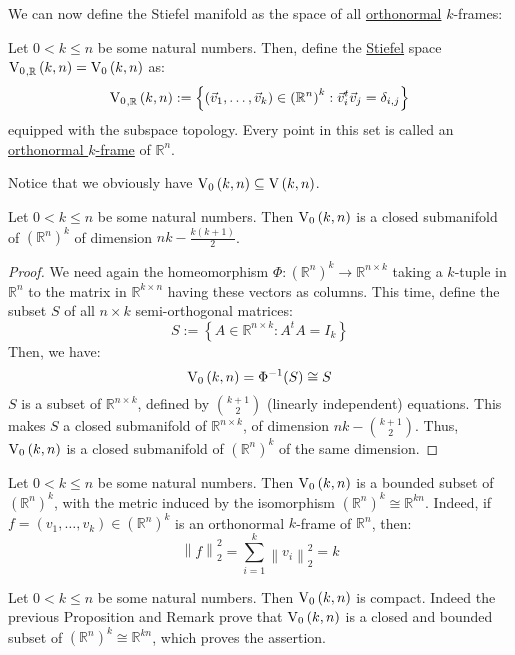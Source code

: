 We can now define the Stiefel manifold as the space of all \ul{orthonormal} $k$-frames:
\begin{definition} Let $0<k\leq n$ be some natural numbers. Then, define the \ul{Stiefel} space $\StO{k}{n}{\mathbb{R}}=\StO{k}{n}$ as:
\[\StO{k}{n}{\mathbb{R}}:=\left\{\left(\vec{v}_1,\ldots,\vec{v}_k\right)\in{\left(\mathbb{R}^n\right)}^k:\vec{v}_i^t\vec{v}_j=\delta_{i,j}\right\}\]
equipped with the subspace topology. Every point in this set is called an \ul{orthonormal $k$-frame} of $\mathbb{R}^n$.
\end{definition}
Notice that we obviously have $\StO{k}{n}\subseteq\St{k}{n}$.

\begin{proposition}\label{prop:StO_dim_closed} Let $0<k\leq n$ be some natural numbers. Then $\StO{k}{n}$ is a closed submanifold of ${\left(\mathbb{R}^n\right)}^k$ of dimension $nk-\frac{k(k+1)}{2}$.
\end{proposition}
\begin{proof}
We need again the homeomorphism $\Phi:{\left(\mathbb{R}^n\right)}^k\to\mathbb{R}^{n\times k}$ taking a $k$-tuple in $\mathbb{R}^n$ to the matrix in $\mathbb{R}^{k\times n}$ having these vectors as columns. This time, define the subset $S$ of all $n\times k$ semi-orthogonal matrices:
\[S:=\left\{A\in\mathbb{R}^{n\times k}:A^t A=I_k\right\}\]
Then, we have:
\[\StO{k}{n}=\Phi^{-1}(S)\cong S\]
$S$ is a subset of $\mathbb{R}^{n\times k}$, defined by $\binom{k+1}{2}$ (linearly independent) equations. This makes $S$ a closed submanifold of $\mathbb{R}^{n\times k}$, of dimension $nk-\binom{k+1}{2}$. Thus, $\StO{k}{n}$ is a closed submanifold of ${\left(\mathbb{R}^n\right)}^k$ of the same dimension.
\end{proof}
\begin{remark} Let $0<k\leq n$ be some natural numbers. Then $\StO{k}{n}$ is a bounded subset of ${\left(\mathbb{R}^n\right)}^k$, with the metric induced by the isomorphism ${\left(\mathbb{R}^n\right)}^k\cong\mathbb{R}^{kn}$. Indeed, if $f=(v_1,\ldots,v_k)\in{\left(\mathbb{R}^n\right)}^k$ is an orthonormal $k$-frame of $\mathbb{R}^n$, then:
\[\left\|f\right\|_2^2=\sum_{i=1}^k\left\|v_i\right\|_2^2=k\]
\end{remark}

\begin{lemma}\label{lem:StO_compact} Let $0<k\leq n$ be some natural numbers. Then $\StO{k}{n}$ is compact. Indeed the previous Proposition and Remark prove that $\StO{k}{n}$ is a closed and bounded subset of ${\left(\mathbb{R}^n\right)}^k\cong\mathbb{R}^{kn}$, which proves the assertion.
\end{lemma}

